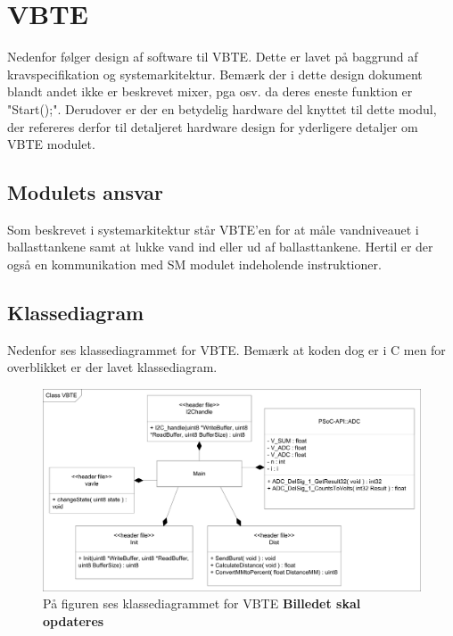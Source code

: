 \chapter{VBTE}
Nedenfor følger design af software til VBTE. Dette er lavet på baggrund af kravspecifikation og systemarkitektur. Bemærk der i dette design dokument blandt andet ikke er beskrevet mixer, pga osv. da deres eneste funktion er "Start();". Derudover er der en betydelig hardware del knyttet til dette modul, der refereres derfor til detaljeret hardware design for yderligere detaljer om VBTE modulet.
\section{Modulets ansvar}
Som beskrevet i systemarkitektur står VBTE'en for at måle vandniveauet i ballasttankene samt at lukke vand ind eller ud af ballasttankene. Hertil er der også en kommunikation med SM modulet indeholende instruktioner.
\section{Klassediagram}
Nedenfor ses klassediagrammet for VBTE. Bemærk at koden dog er i C men for overblikket er der lavet klassediagram.
\begin{figure}
\centering
\includegraphics[width=1\textwidth]{billeder/ClassVBTE}
\caption{På figuren ses klassediagrammet for VBTE \textbf{Billedet skal opdateres}}
\end{figure}

